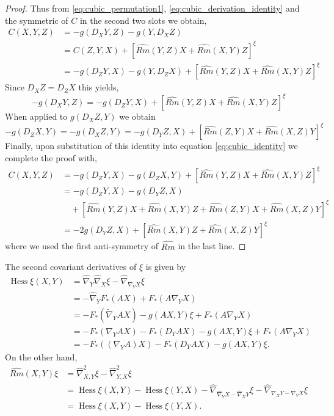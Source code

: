 \documentclass{amsart}
\theoremstyle{definition}
\theoremstyle{remark}
\numberwithin{equation}{section}
\begin{document}
\begin{proof}
Thus from \eqref{eq:cubic_permutation1}, \eqref{eq:cubic_derivation_identity} and the symmetric of $C$ in the second two slots we obtain,
\begin{equation}
\label{eq:cubic_identity}
\begin{split} 
C(X, Y, Z) &= -g(D_X Y, Z) - g(Y, D_X Z) \\
&= C(Z, Y, X) + \left[\widehat{Rm}(Y, Z) X + \widehat{Rm}(X, Y)Z\right]^\xi \\
&= -g(D_Z Y, X) - g(Y, D_Z X) + \left[\widehat{Rm}(Y, Z) X + \widehat{Rm}(X, Y)Z\right]^\xi
\end{split}
\end{equation}
Since $D_X Z = D_Z X$ this yields,
\[
-g(D_X Y, Z) = - g(D_Z Y, X) + \left[\widehat{Rm}(Y, Z) X + \widehat{Rm}(X, Y)Z\right]^\xi
\]
When applied to $g(D_X Z, Y)$ we obtain
\[
-g(D_Z X, Y) = - g(D_X Z, Y) = - g(D_Y Z, X) + \left[\widehat{Rm}(Z, Y) X + \widehat{Rm}(X, Z)Y\right]^\xi
\]
Finally, upon substitution of this identity into equation \eqref{eq:cubic_identity} we complete the proof with,
\begin{equation}
\begin{split}
C(X, Y, Z) &= -g(D_Z Y, X) - g(D_Z X, Y) + \left[\widehat{Rm}(Y, Z) X + \widehat{Rm}(X, Y)Z\right]^\xi \\
&= -g(D_Z Y, X) - g(D_Y Z, X) \\
&\quad + \left[\widehat{Rm}(Y, Z) X + \widehat{Rm}(X, Y)Z + \widehat{Rm}(Z, Y) X + \widehat{Rm}(X, Z)Y\right]^\xi \\
&= - 2g(D_Y Z, X) + \left[\widehat{Rm}(X, Y)Z + \widehat{Rm}(X, Z)Y\right]^{\xi}
\end{split}
\end{equation}
where we used the first anti-symmetry of $\widehat{Rm}$ in the last line.
\end{proof}

The second covariant derivatives of $ \xi$ is given by
\begin{align}
\operatorname{Hess}\xi(X,Y)&=\hat{\nabla}_Y\hat{\nabla}_X\xi-\hat{\nabla}_{\nabla_YX}\xi\\
&=-\hat{\nabla}_YF_{\ast}(AX)+F_{\ast}(A\nabla_YX)\nonumber\\
&=-F_{\ast}(\tilde{\nabla}_{Y}AX)-g(A X,Y)\xi+F_{\ast}(A\nabla_YX)\nonumber\\
&=-F_{\ast}(\nabla_{Y}AX)-F_{\ast}(D_{Y}AX)-g(A X,Y)\xi+F_{\ast}(A\nabla_YX)\nonumber\\
&=-F_{\ast}((\nabla_Y A)X)-F_{\ast}(D_{Y}AX)-g(A X,Y)\xi.\nonumber
\end{align}
On the other hand,
\begin{align}
\widehat{Rm}(X,Y)\xi&=\hat{\nabla}^2_{X,Y}\xi-\hat{\nabla}^2_{Y,X}\xi\\
&=\operatorname{Hess}\xi(X,Y)-\operatorname{Hess}\xi(Y,X)-\hat{\nabla}_{\hat{\nabla}_YX-\hat{\nabla}_XY}\xi-\hat{\nabla}_{\nabla_XY-\nabla_YX}\xi\nonumber\\
&=\operatorname{Hess}\xi(X,Y)-\operatorname{Hess}\xi(Y,X).\nonumber
\end{align}
\end{document}
